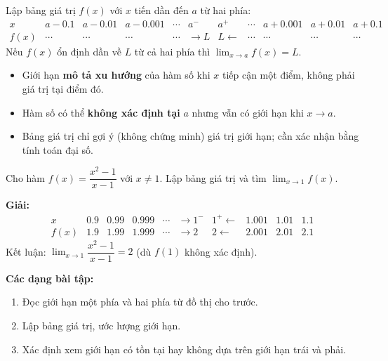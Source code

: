 \documentclass[12pt,a4paper]{article}
\begin{document}
\begin{phuongphap}[title={Đọc giới hạn từ bảng giá trị}]
  Lập bảng giá trị $f(x)$ với $x$ tiến dần đến $a$ từ hai phía:
  \[
    \begin{array}{c|ccccc|ccccc}
      x & a-0.1 & a-0.01 & a-0.001 & \cdots & a^- & a^+ & \cdots & a + 0.001 & a + 0.01 & a + 0.1 \\
      \hline
      f(x) & \cdots & \cdots & \cdots & \cdots & \to L & L \leftarrow & \cdots & \cdots & \cdots & \cdots
    \end{array}
  \]
  Nếu $f(x)$ ổn định dần về $L$ từ cả hai phía thì $\displaystyle\lim_{x \to a} f(x) = L$.
\end{phuongphap}

\begin{luuy}
  \begin{itemize}
    \item Giới hạn \textbf{mô tả xu hướng} của hàm số khi $x$ tiếp cận một điểm, không phải giá trị tại điểm đó.
    \item Hàm số có thể \textbf{không xác định tại} $a$ nhưng vẫn có giới hạn khi $x \to a$.
    \item Bảng giá trị chỉ gợi ý (không chứng minh) giá trị giới hạn; cần xác nhận bằng tính toán đại số.
  \end{itemize}
\end{luuy}

\begin{vidu}
  Cho hàm $\displaystyle f(x) = \dfrac{x^2 - 1}{x - 1}$ với $x \ne 1$. Lập bảng giá trị và tìm $\displaystyle\lim_{x \to 1} f(x)$.

  \medskip
  \textbf{Giải:}
  \[
    \begin{array}{c|ccccc|cccc}
      x & 0.9 & 0.99 & 0.999 & \cdots & \to 1^- & 1^+ \leftarrow & 1.001 & 1.01 & 1.1 \\
      \hline
      f(x) & 1.9 & 1.99 & 1.999 & \cdots & \to 2 & 2 \leftarrow & 2.001 & 2.01 & 2.1
    \end{array}
  \]
  Kết luận: $\displaystyle\lim_{x \to 1} \dfrac{x^2 - 1}{x - 1} = 2$ (dù $f(1)$ không xác định).
\end{vidu}

\medskip\noindent\textbf{Các dạng bài tập:}
\begin{enumerate}[label=\textbf{Dạng \arabic*:}, leftmargin=*, align=left]
  \item Đọc giới hạn một phía và hai phía từ đồ thị cho trước.
  \item Lập bảng giá trị, ước lượng giới hạn.
  \item Xác định xem giới hạn có tồn tại hay không dựa trên giới hạn trái và phải.
\end{enumerate}
\end{document}
